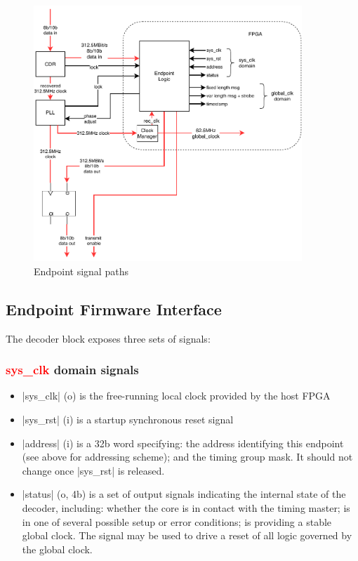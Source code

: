 \documentclass[a4paper,11pt]{article}
\begin{document}
\begin{figure}[p]
	\centering
	\includegraphics[width=0.9\textwidth]{timing_endpoint_block.pdf}
	\caption{Endpoint signal paths}
	\label{fig:fw_if}
\end{figure}

\subsection{Endpoint Firmware Interface}

The decoder block exposes three sets of signals:

\subsubsection{\textcolor{red}{sys\_clk} domain signals}

\begin{itemize}
	\item |sys_clk| (o) is the free-running local clock provided by the host FPGA
	\item |sys_rst| (i) is a startup synchronous reset signal
	\item |address| (i) is a 32b word specifying: the address identifying this endpoint (see above for addressing scheme); and the timing group mask. It should not change once |sys_rst| is released.
	\item |status| (o, 4b) is a set of output signals indicating the internal state of the decoder, including: whether the core is in contact with the timing master; is in one of several possible setup or error conditions; is providing a stable global clock. The signal may be used to drive a reset of all logic governed by the global clock.
\end{itemize}
\end{document}
